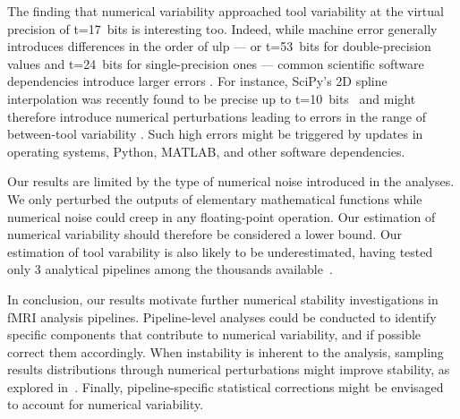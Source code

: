 \documentclass[11pt,onecolumn]{article}
\begin{document}
The finding that numerical variability approached tool variability at the
virtual precision of t=17~bits is interesting too. Indeed, while machine
error generally introduces differences in the order of   ulp
--- or
t=53~bits for double-precision values and t=24~bits for single-precision
ones --- common scientific software dependencies introduce larger errors
.
For instance, SciPy's 2D spline interpolation was recently found to be
precise up to t=10~bits~\cite{pytracer} 
 and might therefore introduce
numerical perturbations leading to errors in the range of between-tool
variability . Such high errors
might be triggered by updates in operating systems, Python, MATLAB, and
other software dependencies.

Our results are limited by the type of numerical noise introduced in the
analyses. We only perturbed the outputs of elementary
mathematical functions while numerical noise could creep in any
floating-point operation. Our estimation of numerical variability should
therefore be considered a lower bound. Our estimation of tool varability is
also likely to be underestimated, having tested only 3 analytical pipelines
among the thousands available~\cite{carp2012plurality}.

In conclusion, our results motivate further numerical stability
investigations in fMRI analysis pipelines. Pipeline-level analyses could be
conducted to identify specific components that contribute to numerical
variability, and if possible correct them accordingly. When instability is
inherent to the analysis, sampling results distributions through numerical
perturbations might improve stability, as explored in~\cite{kiar2021data}.
Finally, pipeline-specific statistical corrections might be envisaged to
account for numerical variability.



\end{document}
